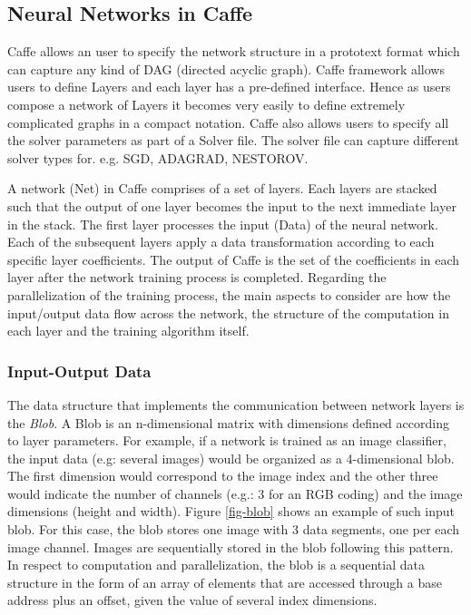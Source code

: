 \subsection{Neural Networks in Caffe}
Caffe allows an user to specify the network structure in a prototext format which can capture any kind of DAG (directed acyclic graph).
Caffe framework allows users to define Layers and each layer has a pre-defined interface. Hence as users compose a network of Layers
it becomes very easily to define extremely complicated graphs in a compact notation. 
Caffe also allows users to specify all the solver parameters as part of a Solver file. The solver file can capture different solver types 
for. e.g. SGD, ADAGRAD, NESTOROV. 

A network (Net) in Caffe comprises of a set of layers. Each layers are stacked
such that the output of one layer becomes the input to the next immediate layer in the stack. The first layer processes the input (Data) of the neural
network. Each of the subsequent layers apply a data transformation 
according to each specific layer coefficients. The output of Caffe is the 
set of the coefficients in each layer after the network training process is
completed. Regarding the parallelization of the training process, the
main aspects to consider are how the input/output data flow across
the network, the structure of the computation in each layer and the
training algorithm itself.

\subsubsection{Input-Output Data}
The data structure that implements the communication between
network layers is the \emph{Blob}. A Blob is an n-dimensional matrix with
dimensions defined according to layer parameters. For example, if
a network is trained as an image classifier, the input data (e.g:
several images) would be organized as a 4-dimensional blob. The
first dimension would correspond to the image index and the other
three would indicate the number of channels (e.g.: 3 for an RGB
coding) and the image dimensions (height and width). Figure \ref{fig-blob}
shows an example of such input blob. For this case, the blob 
stores one image with 3 data segments, one per each image channel. 
Images are sequentially stored in the blob following this pattern. 
In respect to computation and parallelization, the blob
is a sequential data structure in the form of an array of elements
that are accessed through a base address plus an offset, given the
value of several index dimensions.


